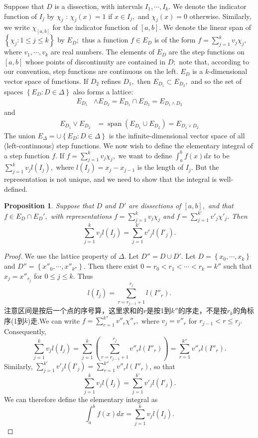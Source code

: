 \documentclass[12pt]{book}
\theoremstyle{definition}\newtheorem{dfn}{Définition}[chapter]
\theoremstyle{plain}\newtheorem{thm}{Théorème}[chapter]
\theoremstyle{plain}\newtheorem{prp}{Proposition}[chapter]
\theoremstyle{plain}\newtheorem{lem}{\bf Lemme}[chapter]
\theoremstyle{plain}\newtheorem{axm}{\bf Axiome}[chapter]
\theoremstyle{plain}\newtheorem{lmm}{\bf Lemme}[chapter]
\theoremstyle{plain}\newtheorem{cor}{\bf Corollaire}[chapter]
\theoremstyle{remark}\newtheorem{rem}{Remarque}[chapter]
\begin{document}
Suppose that $D$ is a dissection, with intervals $I_1,\cdots,I_k.$ We denote the indicator function of $I_j$ by $\chi_j$ : $\chi_j (x) = 1$ if $x \in I_j,$ and $\chi_j (x) = 0$ otherwise. Similarly, we write $\chi_{[a,b]}$ for the indicator function of $[a, b].$ We denote the linear span of $\left\{\chi_j : 1 \le j \le k\right\}$ by $E_D;$ thus a function $f \in E_D$ is of the form $f =\sum^k _{j=1} v_j\chi_j ,$ where $v_1,\cdots,v_k$ are real numbers. The elements of $E_D$ are the step functions on $[a, b]$ whose points of discontinuity are contained in $D;$ note that, according to our convention, step functions are continuous on the left. $E_D$ is a $k$-dimensional vector space of functions. If $D_2$ refines $D_1,$ then $E_{D_1} \subset E_{D_2},$ and so the set of spaces $\left\{E_D : D \in \Delta\right\}$ also forms a lattice:
$$
\begin{aligned}
  E_{D_{1}} & \wedge E_{D_{2}}=E_{D_{1}} \cap E_{D_{2}}=E_{D_{1} \wedge D_{2}}
\end{aligned}
$$
and
$$
\begin{aligned}
 E_{D_{1}} \vee E_{D_{2}} &=\operatorname{span}\left(E_{D_{1}} \cup E_{D_{2}}\right)=E_{D_{1} \vee D_{2}}
\end{aligned}
$$
The union $E_{\Delta}=\cup\left\{E_{D}: D \in \Delta\right\}$ is the infinite-dimensional vector space of all (left-continuous) step functions.
We now wish to define the elementary integral of a step function $f .$ If $f=\sum_{j=1}^{k} v_{j} \chi_{j},$ we want to define $\int_{a}^{b} f(x) d x$ to be $\sum_{j=1}^{k} v_{j} l\left(I_{j}\right),$ where $l\left(I_{j}\right)=x_{j}-x_{j-1}$ is the length of $I_{j} .$ But the representation is not unique, and we need to show that the integral is well-defined.
\begin{prp}
  Suppose that $D$ and $D'$ are dissections of $[a, b],$ and that $f \in E_D\cap E_D' ,$ with representations $f =\sum^k_{j=1} v_j\chi_j$ and $f =\sum^{k'}_{j=1} v'_j\chi'_j .$ Then $$\sum^k_{j=1}v_jl(I_j)=\sum^{k'}_{j=1} v'_j l(I'_j).$$
\end{prp}
\begin{proof} We use the lattice property of $\Delta.$ Let $D'' = D \cup D'.$ Let $D = \left\{x_0,\cdots,x_k\right\}$ and $D'' = \left\{x''_0,\cdots,x''_{k''}\right\}.$ Then there exist $0 = r_0 < r_1 < \cdots < r_k = k''$ such that $x_j = x''_{r_j}$ for $0 \le j \le k.$ Thus $$l(I_j) =\sum^{r_j}_{r=r_{j−1}+1} l(I''_r).$$ 注意区间是按后一个点的序号算，这里求和的$r$是按1到$k''$的序走，不是按$r_{k}$的角标序(1到$k$)走.We can write $f =\sum^{k''}_{r=1} v''_r\chi''_r,$ where $v_j = v''_r$ for $r_{j−1} < r \le r_j.$ Consequently, $$\sum^k_{j=1}v_j l(I_j) = \sum^k_{j=1} \left( \sum^{r_j}_{r=r_{j−1}+1} v''_r l(I''_r )\right) = \sum^{k''}_{r=1} v''_r l(I''_r).$$
Similarly, $\sum^{k'}_{j=1}v'_j l(I'_j)=\sum^{k''}_{r=1} v''_r l(I''_r)$, so that $$\sum^k_{j=1}v_jl(I_j)=\sum^{k'}_{j=1} v'_j l(I'_j).$$
We can therefore define the elementary integral as $$\int_{a}^{b} f(x) d x=  \sum^k_{j=1}v_jl(I_j).$$
\end{proof}
\end{document}
